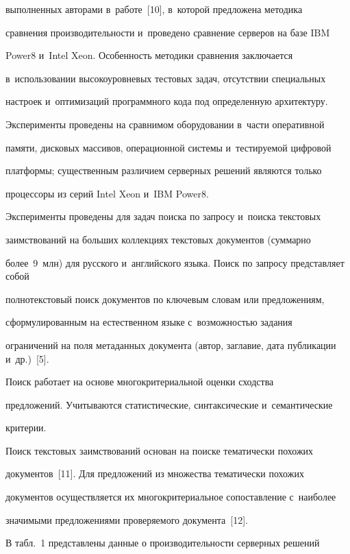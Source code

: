 выполненных авторами в~работе~[10], в~которой предложена методика 

сравнения производительности и~проведено сравнение серверов на базе IBM 

Power8 и~Intel Xeon. Особенность методики сравнения заключается 

в~использовании высокоуровневых тестовых задач, отсутствии специальных 

настроек и~оптимизаций программного кода под определенную архитектуру. 

Эксперименты проведены на сравнимом оборудовании в~час\-ти оперативной 

памяти, дисковых массивов, операционной сис\-те\-мы и~тес\-ти\-ру\-емой циф\-ро\-вой 

платформы; существенным различием серверных решений являются только 

процессоры из серий Intel Xeon и~IBM Power8.

  

  Эксперименты проведены для задач поиска по запросу и~поиска текстовых 

заимствований на больших коллекциях текстовых документов (суммарно 

более~9~млн) для русского и~английского языка. Поиск по запросу представляет собой 

полнотекстовый поиск документов по ключевым словам или предложениям, 

сформулированным на естественном языке с~возможностью задания 

ограничений на поля метаданных документа (автор, заглавие, дата публикации и~др.)~[5]. 

Поиск работает на основе многокритериальной оценки сходства 

предложений. Учитываются статистические, синтаксические и~семантические 

критерии.

  

  Поиск текстовых заимствований основан на поиске тематически похожих 

документов~[11]. Для предложений из множества тематически похожих 

документов осуществляется их многокритериальное сопоставление с~наиболее 

значимыми предложениями проверяемого документа~[12]. 

  

  В табл.~1 представлены данные о производительности серверных решений 

